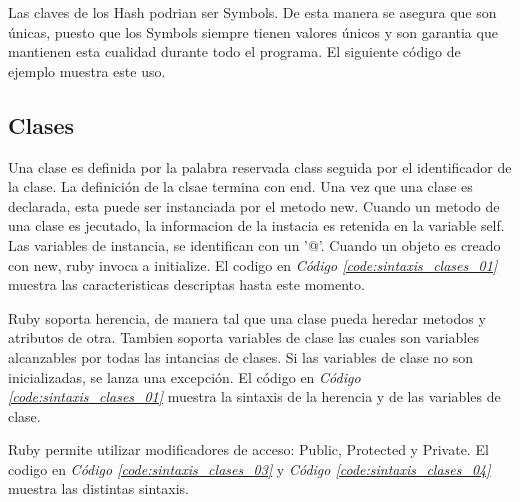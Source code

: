 \documentclass{article}
\newcommand{\refcode}[1]{\textit{Código \ref{#1}}}
\begin{document}
Las claves de los Hash podrian ser Symbols. De esta manera se asegura que son únicas, puesto que los Symbols siempre tienen valores únicos y son garantia que mantienen esta cualidad durante todo el programa. El siguiente código de ejemplo muestra este uso.

 
\bigskip



\subsection{Clases}

Una clase es definida por la palabra reservada class seguida por el identificador de la clase. La definición de la clsae termina con end.
Una vez que una clase es declarada, esta puede ser instanciada por el metodo new. 
Cuando un metodo de una clase es jecutado, la informacion de la instacia es retenida en la variable self.
Las variables de instancia, se identifican con un '@'.  
Cuando un objeto es creado con new, ruby invoca a initialize. El codigo  en  \refcode{code:sintaxis_clases_01} muestra las caracteristicas descriptas hasta este momento.

 
\bigskip

Ruby soporta herencia, de manera tal que una clase pueda heredar metodos y atributos de otra. 
Tambien soporta variables de clase las cuales son variables alcanzables por todas las intancias de clases. Si las variables de clase no son inicializadas, se lanza una excepción.  El código  en  \refcode{code:sintaxis_clases_01} muestra la sintaxis de la herencia y de las variables de clase. 

 
\bigskip

Ruby permite utilizar modificadores de acceso: Public, Protected y Private. El codigo en \refcode{code:sintaxis_clases_03} y \refcode{code:sintaxis_clases_04} muestra las distintas sintaxis.

 
\bigskip

 
\bigskip
\end{document}
